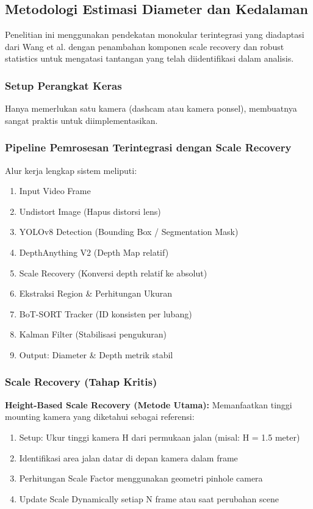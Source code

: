 \documentclass[12pt,a4paper]{article}
\begin{document}
\subsection{Metodologi Estimasi Diameter dan Kedalaman}

Penelitian ini menggunakan pendekatan monokular terintegrasi yang diadaptasi dari Wang et al. \cite{wang2025} dengan penambahan komponen scale recovery dan robust statistics untuk mengatasi tantangan yang telah diidentifikasi dalam analisis.

\subsubsection{Setup Perangkat Keras}
Hanya memerlukan satu kamera (dashcam atau kamera ponsel), membuatnya sangat praktis untuk diimplementasikan.

\subsubsection{Pipeline Pemrosesan Terintegrasi dengan Scale Recovery}

Alur kerja lengkap sistem meliputi:
\begin{enumerate}
    \item Input Video Frame
    \item Undistort Image (Hapus distorsi lens)
    \item YOLOv8 Detection (Bounding Box / Segmentation Mask)
    \item DepthAnything V2 (Depth Map relatif)
    \item Scale Recovery (Konversi depth relatif ke absolut)
    \item Ekstraksi Region \& Perhitungan Ukuran
    \item BoT-SORT Tracker \cite{aharon2022} (ID konsisten per lubang)
    \item Kalman Filter \cite{kalman1960} (Stabilisasi pengukuran)
    \item Output: Diameter \& Depth metrik stabil
\end{enumerate}

\subsubsection{Scale Recovery (Tahap Kritis)}

\textbf{Height-Based Scale Recovery (Metode Utama):}
Memanfaatkan tinggi mounting kamera yang diketahui sebagai referensi:
\begin{enumerate}
    \item Setup: Ukur tinggi kamera H dari permukaan jalan (misal: H = 1.5 meter)
    \item Identifikasi area jalan datar di depan kamera dalam frame
    \item Perhitungan Scale Factor menggunakan geometri pinhole camera
    \item Update Scale Dynamically setiap N frame atau saat perubahan scene
\end{enumerate}
\end{document}
